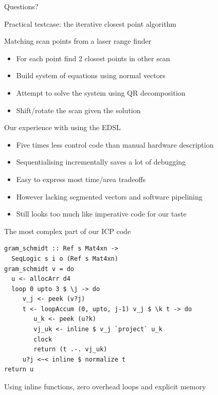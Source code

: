 \documentclass[pdf]{beamer}
\begin{document}
\begin{frame}
\Huge{\centerline{Questions?}}
\end{frame}

\begin{frame}{Practical testcase: the iterative closest point algorithm}
\begin{block}{Matching scan points from a laser range finder}
\begin{itemize}
\item For each point find 2 closest points in other scan
\item Build system of equations using normal vectors 
\item Attempt to solve the system using QR decomposition
\item Shift/rotate the scan given the solution
\end{itemize}
\end{block}

\begin{block}{Our experience with using the EDSL}
\begin{itemize}
\item Five times less control code than manual hardware description
\item Sequentialising incrementally saves a lot of debugging
\item Easy to express most time/area tradeoffs
\item However lacking segmented vectors and software pipelining
\item Still looks too much like imperative code for our taste
\end{itemize}
\end{block}

\end{frame}


\begin{frame}[fragile]{The most complex part of our ICP code}
\begin{block}{}
\begin{verbatim}
gram_schmidt :: Ref s Mat4xn -> 
  SeqLogic s i o (Ref s Mat4xn)
gram_schmidt v = do
  u <- allocArr d4
  loop 0 upto 3 $ \j -> do
     v_j <- peek (v?j)
     t <- loopAccum (0, upto, j-1) v_j $ \k t -> do
        u_k <- peek (u?k)
        vj_uk <- inline $ v_j `project` u_k
        clock
        return (t .-. vj_uk)
     u?j <~< inline $ normalize t
return u
\end{verbatim}
\end{block}

\begin{block}{}
Using inline functions, zero overhead loops and explicit memory
\end{block}

\end{frame}
\end{document}
